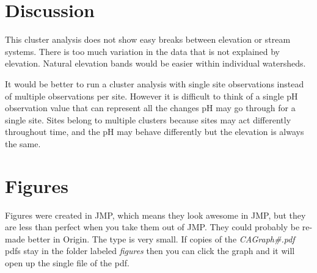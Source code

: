 \documentclass[11pt]{article} %
\begin{document}
\section{Discussion}

This cluster analysis does not show easy breaks between elevation or stream systems.  There is too much variation in the data that is not explained by elevation. Natural elevation bands would be easier within individual watersheds.

It would be better to run a cluster analysis with single site observations instead of multiple observations per site.  However it is difficult to think of a single pH observation value that can represent all the changes pH may go through for a single site.  Sites belong to multiple clusters because sites may act differently throughout time, and the pH may behave differently but the elevation is always the same.
\pagebreak

\section{Figures}
Figures were created in JMP, which means they look awesome in JMP, but they are less than perfect when you take them out of JMP.  They could probably be re-made better in Origin.
The type is very small.  If copies of the {\it CAGraph\#.pdf}  pdfs stay in the folder labeled {\it figures}  then you can click the graph and it will open up the single file of the pdf.
\pagebreak

\label{CAGraph1}


\label{CAGraph2}


\label{CAGraph3}


\label{CAGraph6}


\label{CAGraph8}


\label{CAGraph9}


\label{CAGraph10}

\end{document}
